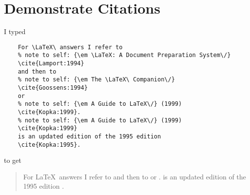 %
%


\chapter{Demonstrate Citations}

I typed

\begin{verbatim}
    For \LaTeX\ answers I refer to
    % note to self: {\em \LaTeX: A Document Preparation System\/}
    \cite{Lamport:1994}
    and then to
    % note to self: {\em The \LaTeX\ Companion\/}
    \cite{Goossens:1994}
    or
    % note to self: {\em A Guide to LaTeX\/} (1999)
    \cite{Kopka:1999}.
    % note to self: {\em A Guide to LaTeX\/} (1999)
    \cite{Kopka:1999}
    is an updated edition of the 1995 edition
    \cite{Kopka:1995}.
\end{verbatim}

to get

\begin{quotation}
    For \LaTeX\ answers I refer to
    \cite{Lamport:1994}
    and then to
    \cite{Goossens:1994}
    or
    \cite{Kopka:1999}.
    \cite{Kopka:1999}
    is an updated edition of the 1995 edition
    \cite{Kopka:1995}.
\end{quotation}
